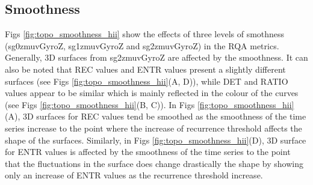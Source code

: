 \subsection{Smoothness}
Figs \ref{fig:topo_smoothness_hii} show the effects of three levels of 
smothness (sg0zmuvGyroZ, sg1zmuvGyroZ and sg2zmuvGyroZ) in the RQA metrics.
Generally, 3D surfaces from sg2zmuvGyroZ are affected by the smoothness.
It can also be noted that REC values and ENTR values present a slightly 
different surfaces (see Figs \ref{fig:topo_smoothness_hii}(A, D)), 
while DET and RATIO values appear to be similar which is mainly reflected in 
the colour of the curves (see Figs \ref{fig:topo_smoothness_hii}(B, C)).
In Figs \ref{fig:topo_smoothness_hii}(A), 3D surfaces for REC values tend be 
smoothed as the smoothness of the time series increase to the point where 
the increase of recurrence threshold affects the shape of the surfaces.
Similarly, in Figs  \ref{fig:topo_smoothness_hii}(D), 
3D surface for ENTR values is affected by the smoothness of the 
time series to the point that the fluctuations in the surface does change 
drastically the shape by showing only an increase of ENTR values as
the recurrence threshold increase.

